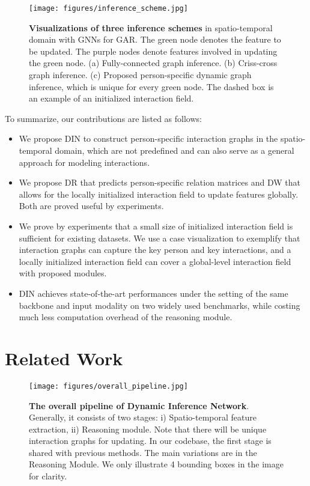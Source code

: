 \documentclass[10pt,twocolumn,letterpaper]{article}
\begin{document}
\begin{figure}[t]
\centering
\texttt{[image: figures/inference\_scheme.jpg]} \caption{\textbf{Visualizations of three inference schemes} in spatio-temporal domain with GNNs for GAR. The green node denotes the feature to be updated. The purple nodes denote features involved in updating the green node. (a) Fully-connected graph inference. (b) Criss-cross graph inference. (c) Proposed person-specific dynamic graph inference, which is unique for every green node. The dashed box is an example of an initialized interaction field.}
\label{inference_scheme}
\vspace{-0.4cm}
\end{figure}


To summarize, our contributions are listed as follows: 
\begin{itemize}[noitemsep,topsep=0pt,parsep=0pt,partopsep=0pt]
    \item We propose DIN to construct person-specific interaction graphs in the spatio-temporal domain, which are not predefined and can also serve as a general approach for modeling interactions.  
    \item We propose DR that predicts person-specific relation matrices and DW that allows for the locally initialized interaction field to update features globally. Both are proved useful by experiments.
    \item We prove by experiments that a small size of initialized interaction field is sufficient for existing datasets. We use a case visualization to exemplify that interaction graphs can capture the key person and key interactions, and a locally initialized interaction field can cover a global-level interaction field with proposed modules. 
\item DIN achieves state-of-the-art performances under the setting of the same backbone and input modality on two widely used benchmarks, while costing much less computation overhead of the reasoning module. 
\end{itemize}











\section{Related Work}
\begin{figure*}[t]
\centering
\texttt{[image: figures/overall\_pipeline.jpg]} 
\caption{\textbf{The overall pipeline of Dynamic Inference Network}. Generally, it consists of two stages: i) Spatio-temporal feature extraction, ii) Reasoning module. Note that there will be  unique interaction graphs for updating. In our codebase, the first stage is shared with previous methods. The main variations are in the Reasoning Module. We only illustrate 4 bounding boxes in the image for clarity.}
\label{overall_pipeline}
\vspace{-0.4cm}
\end{figure*}
\end{document}
